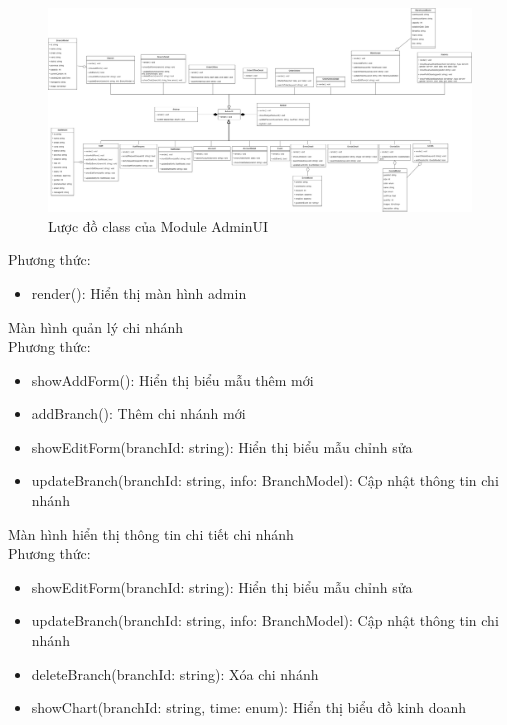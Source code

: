 \begin{figure}[!htp]
    \centering
    \includegraphics[width=17cm]{img/Architecture/UI/adminUI.png}
    \newline
    \caption{Lược đồ class của Module AdminUI}
\end{figure}
 
Phương thức:
\begin{itemize}
    \item render(): Hiển thị màn hình admin
\end{itemize}
 
Màn hình quản lý chi nhánh\\
Phương thức:
\begin{itemize}
    \item showAddForm(): Hiển thị biểu mẫu thêm mới
    \item addBranch(): Thêm chi nhánh mới
    \item showEditForm(branchId: string): Hiển thị biểu mẫu chỉnh sửa
    \item updateBranch(branchId: string, info: BranchModel): Cập nhật thông tin chi nhánh
\end{itemize}
 
Màn hình hiển thị thông tin chi tiết chi nhánh\\
Phương thức:
\begin{itemize}
    \item showEditForm(branchId: string): Hiển thị biểu mẫu chỉnh sửa
    \item updateBranch(branchId: string, info: BranchModel): Cập nhật thông tin chi nhánh
    \item deleteBranch(branchId: string): Xóa chi nhánh
    \item showChart(branchId: string, time: enum): Hiển thị biểu đồ kinh doanh
\end{itemize}
 
